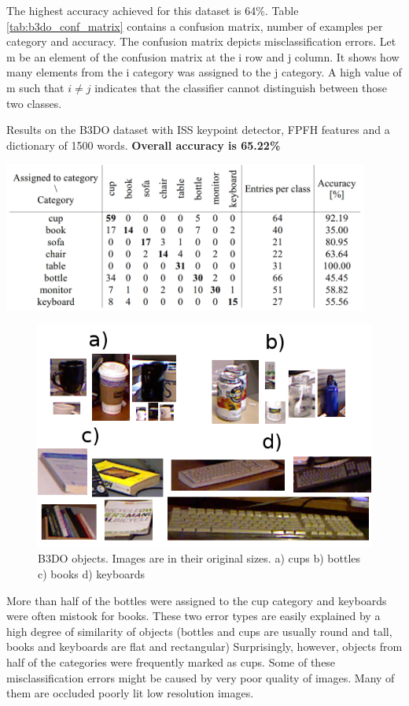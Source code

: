 	The highest accuracy achieved for this dataset is 64\%. Table \ref{tab:b3do_conf_matrix} contains a confusion matrix, number of examples per category and accuracy. The confusion matrix depicts misclassification errors. Let m be an element of the confusion matrix at the i row and j column. It shows how many elements from the i category was assigned to the j category. A high value of m such that $i \neq j$ indicates that the classifier cannot distinguish between those two classes.
	
	\begin{table}[!ht]
	\centering
	\caption{Results on the B3DO dataset with ISS keypoint detector, FPFH features and a dictionary of 1500 words. \textbf{Overall accuracy is 65.22\%}}
	\includegraphics[width=0.9\textwidth]{figs/b3do_conf_matrix}	
	\label{tab:b3do_conf_matrix}
	\end{table}
	
	\begin{figure}[!ht]
	\centering	
	\includegraphics[width=.75\textwidth]{figs/b3do_objects}
	\caption{B3DO objects. Images are in their original sizes. a) cups b) bottles c) books d) keyboards}
	\label{fig:b3do_objects}
	\end{figure}
	
	More than half of the bottles were assigned to the cup category and keyboards were often mistook for books. These two error types are easily explained by a high degree of similarity of objects (bottles and cups are usually round and tall, books and keyboards are flat and rectangular) Surprisingly, however, objects from half of the categories were frequently marked as cups. Some of these misclassification errors might be caused by very poor quality of images. Many of them are occluded poorly lit low resolution images.	
	
